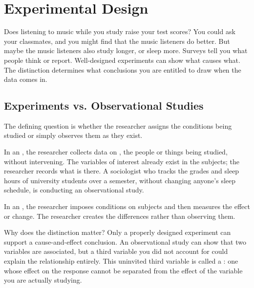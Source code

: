 \chapter{Experimental Design}


Does listening to music while you study raise your test scores? You could
ask your classmates, and you might find that the music listeners do better.
But maybe the music listeners also study longer, or sleep more. Surveys
tell you what people think or report. Well-designed experiments can show
what causes what. 
The distinction  determines what conclusions you are entitled to draw when the 
data comes in.

\section{Experiments vs. Observational Studies}

The defining question is whether the researcher assigns the conditions being studied or simply observes them as they exist.

In an , the researcher collects data on , the people or things being studied, without intervening. 
The variables of interest already exist in the subjects; the researcher records what is there. A sociologist who tracks the grades 
and sleep hours of university students over a semester, without changing anyone's sleep schedule, is conducting an observational study.

In an , the researcher imposes conditions on subjects and then measures the 
effect or change. The researcher creates the differences rather than observing them. 

Why does the distinction matter? Only a properly designed experiment can support a cause-and-effect 
conclusion. An observational 
study can show that two variables are associated, but a third variable you did not account for could 
explain the relationship 
entirely. This uninvited third variable is called a 
: 
one whose effect on the 
response cannot be separated from the effect of the variable you are actually studying.

